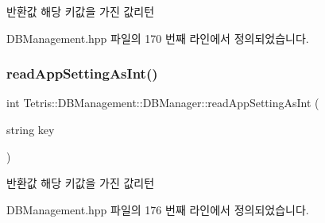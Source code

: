 \begin{DoxyReturn}{반환값}
해당 키값을 가진 값리턴 
\end{DoxyReturn}


D\+B\+Management.\+hpp 파일의 170 번째 라인에서 정의되었습니다.

\mbox{\label{class_tetris_1_1_d_b_management_1_1_d_b_manager_ac52daf6ea2310b848278454c30698436}} 
\subsubsection{\texorpdfstring{read\+App\+Setting\+As\+Int()}{readAppSettingAsInt()}}
{\footnotesize\ttfamily int Tetris\+::\+D\+B\+Management\+::\+D\+B\+Manager\+::read\+App\+Setting\+As\+Int (\begin{DoxyParamCaption}\item[{string}]{key }\end{DoxyParamCaption})\hspace{0.3cm}{\ttfamily [inline]}}

\begin{DoxyReturn}{반환값}
해당 키값을 가진 값리턴 
\end{DoxyReturn}


D\+B\+Management.\+hpp 파일의 176 번째 라인에서 정의되었습니다.

